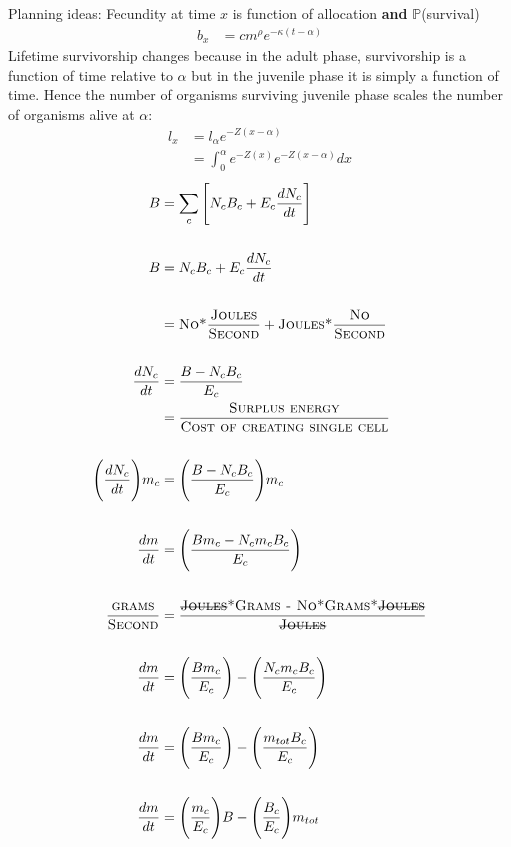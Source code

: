\documentclass[a4paper]{article} %
\begin{document}
Planning ideas:
Fecundity at time $x$ is function of allocation \textbf{and} $\mathbb{P}$(survival)
\begin{align*}
    b_x &= cm^{\rho}e^{-\kappa(t-\alpha)}
\end{align*}
Lifetime survivorship changes because in the adult phase, survivorship is a function of time relative to $\alpha$ but in the juvenile phase it is simply a function of time. Hence the number of organisms surviving juvenile phase scales the number of organisms alive at $\alpha$:
\begin{align*}
    l_x &= l_{\alpha}e^{-Z(x-\alpha)} \\
    &= \int_0^{\alpha}e^{-Z(x)}e^{-Z(x-\alpha)}dx
\end{align*}
\newpage
\begin{align*}
    B &= \sum_c \Bigg[N_{c}B_{c} + E_{c}\frac{dN_{c}}{dt}\Bigg] \\ \\
    B &= N_{c}B_{c} + E_{c}\frac{dN_{c}}{dt} \\ \\
    &= \textsc{No*}\frac{\textsc{Joules}}{\textsc{Second}} + \textsc{Joules*}\frac{\textsc{No}}{\textsc{Second}}\\ \\
    \frac{dN_{c}}{dt} &= \frac{B - N_{c}B_{c}}{E_{c}} \\
    &= \frac{\textsc{Surplus energy}}{\textsc{Cost of creating single cell}} \\ \\
    \Bigg(\frac{dN_{c}}{dt}\Bigg)m_c &= \Bigg(\frac{B - N_{c}B_{c}}{E_{c}}\Bigg)m_c \\ \\
    \frac{dm}{dt} &= \Bigg(\frac{Bm_c - N_{c}m_{c}B_{c}}{E_c}\Bigg) \\ \\
    \frac{\textsc{grams}}{\textsc{Second}} &= \frac{\textsc{\st{Joules}*Grams - No*Grams*\st{Joules}}}{\textsc{\st{Joules}}} \\ \\
    \frac{dm}{dt} &= \Bigg(\frac{Bm_c}{E_c}\Bigg) - \Bigg(\frac{N_{c}m_{c}B_{c}}{E_c}\Bigg) \\ \\
    \frac{dm}{dt} &= \Bigg(\frac{Bm_c}{E_c}\Bigg) - \Bigg(\frac{m_{tot}B_{c}}{E_c}\Bigg) \\ \\
    \frac{dm}{dt} &= \Bigg(\frac{m_c}{E_c}\Bigg)B - \Bigg(\frac{B_{c}}{E_c}\Bigg)m_{tot} \\ \\

\end{align*}
\end{document}
